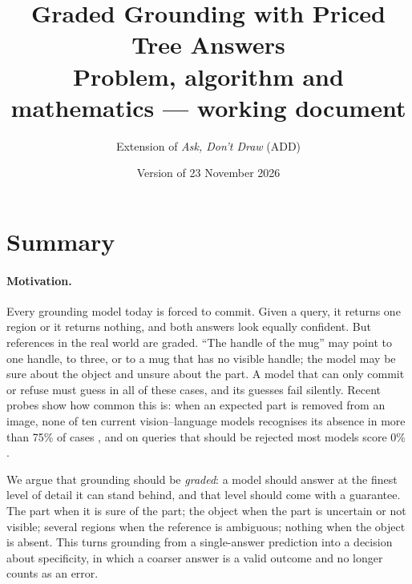 \documentclass[11pt,a4paper]{article}
\title{Graded Grounding with Priced Tree Answers\\[4pt]
\large Problem, algorithm and mathematics --- working document}
\author{Extension of \emph{Ask, Don't Draw} (ADD)}
\date{Version of 23 November 2026}
\theoremstyle{definition}
\theoremstyle{remark}
\begin{document}
\maketitle

\noindent{}

\tableofcontents

\section{Summary}
\paragraph{Motivation.}
Every grounding model today is forced to commit. Given a query, it returns one region or it returns nothing, and
both answers look equally confident. But references in the real world are graded. ``The handle of the mug'' may
point to one handle, to three, or to a mug that has no visible handle; the model may be sure about the object and
unsure about the part. A model that can only commit or refuse must guess in all of these cases, and its guesses
fail silently. Recent probes show how common this is: when an expected part is removed from an image, none of ten
current vision--language models recognises its absence in more than 75\% of cases \cite{missing}, and on queries
that should be rejected most models score 0\% \cite{groundingme}.

We argue that grounding should be \emph{graded}: a model should answer at the finest level of detail it can stand
behind, and that level should come with a guarantee. The part when it is sure of the part; the object when the part
is uncertain or not visible; several regions when the reference is ambiguous; nothing when the object is absent.
This turns grounding from a single-answer prediction into a decision about specificity, in which a coarser answer is
a valid outcome and no longer counts as an error.
\end{document}
